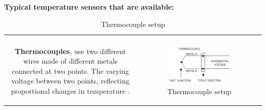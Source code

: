 \textbf{Typical temperature sensors that are available:}  

\begin{table}[H]
    \centering
    \begin{tabular}{|c|c|}
    \hline
    &\\
      \begin{minipage}[b]{0.45\textwidth}
          \textbf{Thermocouples}, use two different wires made of different metals connected at two points. The varying voltage between two points, reflecting proportional changes in temperature \cite{Temprature_sensor}.
          \vspace{10mm}
      \end{minipage}
         & 
      \begin{minipage}[b]{0.45\textwidth}
      \begin{figure}[H]
           \centering
            \includegraphics[width=0.8\textwidth]{Thermocouple.jpg}
            \caption{Thermocouple setup}
      \end{figure}

      \end{minipage}\\


\end{tabular}
\end{table}
